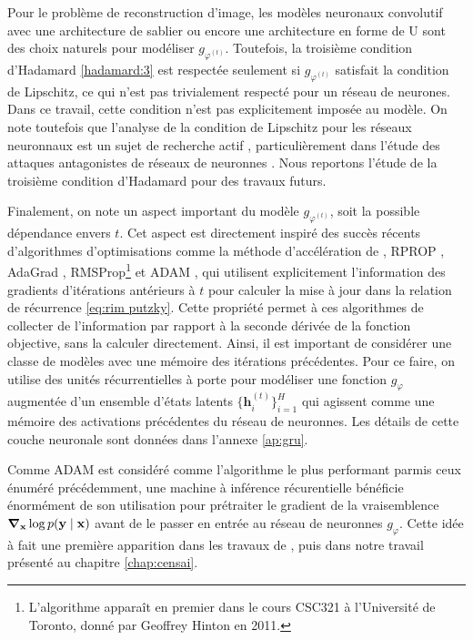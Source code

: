 Pour le problème de reconstruction d'image, les modèles neuronaux convolutif avec une architecture de sablier ou 
encore une architecture en forme de U \citep{Ronneberger2015} sont des choix naturels pour modéliser $g_{\varphi^{(t)}}$. 
Toutefois, la troisième condition d'Hadamard \ref{hadamard:3} est respectée seulement si $g_{\varphi^{(t)}}$ 
satisfait la condition de Lipschitz, ce qui n'est pas trivialement respecté pour un réseau de neurones.
Dans ce travail, cette condition n'est pas explicitement imposée au modèle. 
On note toutefois que l'analyse de la condition de Lipschitz pour les réseaux neuronnaux est un 
sujet de recherche actif \citep[e.g.][]{}, particulièrement dans l'étude des attaques antagonistes de réseaux de neuronnes \citep[e.g.][]{}. 
Nous reportons l'étude de la troisième condition d'Hadamard pour des travaux futurs.

Finalement, on note un aspect important du modèle $g_{\varphi^{(t)}}$, soit la possible dépendance envers $t$. Cet aspect 
est directement inspiré des succès récents d'algorithmes d'optimisations comme la méthode d'accélération de \citet{Nesterov1983}, 
RPROP \citep{Riedmiller1993},
AdaGrad \citep{Duchi2011}, RMSProp\footnote{L'algorithme apparaît en premier dans le cours CSC321 à l'Université de Toronto, donné par Geoffrey Hinton en 2011.} \citep{Hinton2012} 
et ADAM \citep{Kingma2014},
qui utilisent explicitement l'information 
des gradients d'itérations antérieurs à $t$ pour calculer la mise à jour dans la relation de récurrence \eqref{eq:rim putzky}.
Cette propriété permet à ces algorithmes de collecter de l'information par rapport à la seconde dérivée de la fonction 
objective, sans la calculer directement.
Ainsi, il est important de considérer une classe de modèles avec une mémoire des itérations précédentes. Pour ce 
faire, on utilise des unités récurrentielles à porte \citep[de l'anglais \textit{gated recurrent units}:][]{Cho2014} 
pour modéliser une fonction $g_{\varphi}$ augmentée d'un ensemble d'états latents $\{\mathbf{h}^{(t)}_i\}_{i=1}^{H}$ 
qui agissent comme une mémoire des activations précédentes du réseau de neuronnes. Les détails 
de cette couche neuronale sont données dans l'annexe \ref{ap:gru}. 

Comme ADAM est considéré comme l'algorithme le plus performant parmis ceux énuméré précédemment, 
une machine à inférence récurentielle bénéficie énormément de son utilisation pour 
prétraiter le gradient de la vraisemblence $\grad_{\mathbf{x}}\log p(\mathbf{y} \mid \mathbf{x})$ 
avant de le passer en entrée au réseau de neuronnes $g_{\varphi}$. 
Cette idée à fait une première apparition dans les travaux de 
\citet{Modi2021}, puis dans notre travail présenté au chapitre \ref{chap:censai}. 


